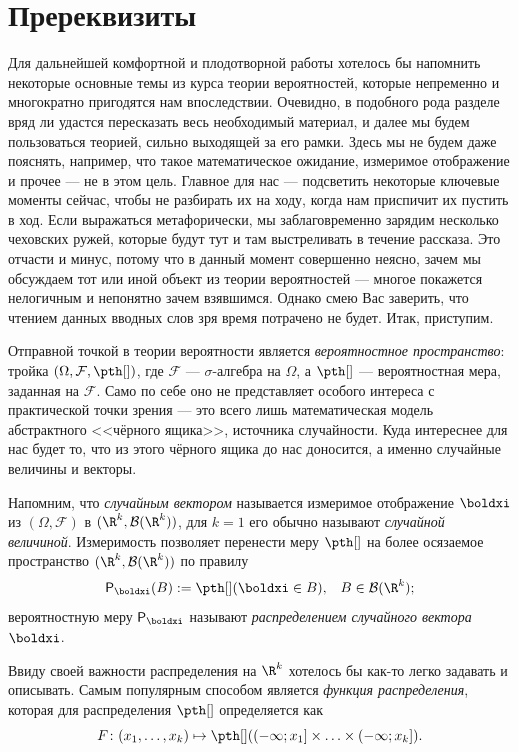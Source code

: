 \section{Пререквизиты}\label{prerequisite}

Для дальнейшей комфортной и плодотворной работы хотелось бы напомнить некоторые основные темы из курса теории вероятностей, которые непременно и многократно пригодятся нам впоследствии. Очевидно, в подобного рода разделе вряд ли удастся пересказать весь необходимый материал, и далее мы будем пользоваться теорией, сильно выходящей за его рамки. Здесь мы не будем даже пояснять, например, что такое математическое ожидание, измеримое отображение и прочее --- не в этом цель. Главное для нас --- подсветить некоторые ключевые моменты сейчас, чтобы не разбирать их на ходу, когда нам приспичит их пустить в ход. Если выражаться метафорически, мы заблаговременно зарядим несколько чеховских ружей, которые будут тут и там выстреливать в течение рассказа. Это отчасти и минус, потому что в данный момент совершенно неясно, зачем мы обсуждаем тот или иной объект из теории вероятностей --- многое покажется нелогичным и непонятно зачем взявшимся. Однако смею Вас заверить, что чтением данных вводных слов зря время потрачено не будет. Итак, приступим.

Отправной точкой в теории вероятности является \textit{вероятностное пространство}: тройка $(\Omega, \mathcal F, \pth[])$, где $\mathcal F$ --- $\sigma$-алгебра на $\Omega$, а $\pth[]$ --- вероятностная мера, заданная на $\mathcal F$. Само по себе оно не представляет особого интереса с практической точки зрения --- это всего лишь математическая модель абстрактного <<чёрного ящика>>, источника случайности. Куда интереснее для нас будет то, что из этого чёрного ящика до нас доносится, а именно случайные величины и векторы. 

Напомним, что \textit{случайным вектором} называется измеримое отображение $\boldxi$ из $(\Omega, \mathcal F)$ в $(\R^k, \mathcal B (\R^k))$, для $k=1$ его обычно называют \textit{случайной величиной}. Измеримость позволяет перенести меру $\pth[]$ на более осязаемое пространство $(\R^k, \mathcal B (\R^k))$ по правилу
$$
\mathsf{P}_{\boldxi}(B) := \pth[](\boldxi \in B), \;\;\; B \in \mathcal B (\R^k);$$
вероятностную меру $\mathsf{P}_{\boldxi}$ называют \textit{распределением случайного вектора $\boldxi$}.

Ввиду своей важности распределения на $\R^k$ хотелось бы как-то легко задавать и описывать. Самым популярным способом является \textit{функция распределения}, которая для распределения $\pth[]$ определяется как
\[
F\colon (x_1, \ldots, x_k) \mapsto \pth[]((-\infty; x_1] \times \ldots \times (-\infty; x_k]).
\]

